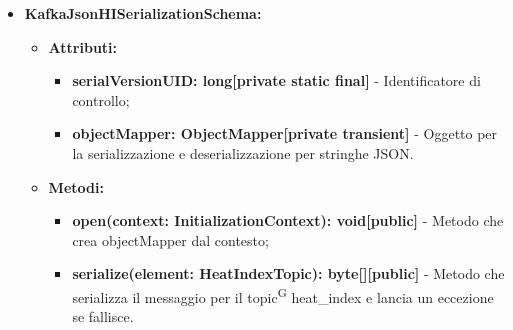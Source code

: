 \documentclass[8pt]{article}
\newcommand{\glossterm}[1]{#1\textsuperscript{G}} %
\begin{document}
\begin{itemize}
\begin{itemize}
\begin{itemize}
        \end{itemize}
    \end{itemize}
    \item \textbf{KafkaJsonHISerializationSchema:}
    \begin{itemize}
	\setlength\itemsep{0em}
        \item \textbf{Attributi:}
        \begin{itemize}
	\setlength\itemsep{0em}
            \item \textbf{serialVersionUID: long[private static final]} - Identificatore di controllo;
            \item \textbf{objectMapper: ObjectMapper[private transient]} - Oggetto per la serializzazione e deserializzazione per stringhe JSON.
        \end{itemize}
    \end{itemize}
    \begin{itemize}
	\setlength\itemsep{0em}
        \item \textbf{Metodi:}
        \begin{itemize}
	\setlength\itemsep{0em}
            \item \textbf{open(context: InitializationContext): void[public]} - Metodo che crea objectMapper dal contesto;
            \item \textbf{serialize(element: HeatIndexTopic): byte[][public]} - Metodo che serializza il messaggio per il \glossterm{topic} heat\_index e lancia un eccezione se fallisce.
        \end{itemize}
    \end{itemize}
\end{itemize}
\end{document}

